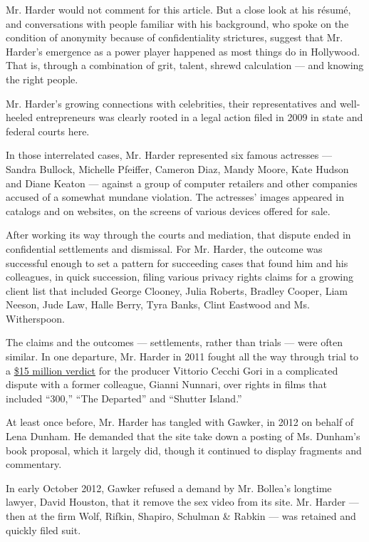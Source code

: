 Mr. Harder would not comment for this article. But a close look at his
résumé, and conversations with people familiar with his background, who
spoke on the condition of anonymity because of confidentiality
strictures, suggest that Mr. Harder's emergence as a power player
happened as most things do in Hollywood. That is, through a combination
of grit, talent, shrewd calculation --- and knowing the right people.

Mr. Harder's growing connections with celebrities, their representatives
and well-heeled entrepreneurs was clearly rooted in a legal action filed
in 2009 in state and federal courts here.

In those interrelated cases, Mr. Harder represented six famous actresses
--- Sandra Bullock, Michelle Pfeiffer, Cameron Diaz, Mandy Moore, Kate
Hudson and Diane Keaton --- against a group of computer retailers and
other companies accused of a somewhat mundane violation. The actresses'
images appeared in catalogs and on websites, on the screens of various
devices offered for sale.

After working its way through the courts and mediation, that dispute
ended in confidential settlements and dismissal. For Mr. Harder, the
outcome was successful enough to set a pattern for succeeding cases that
found him and his colleagues, in quick succession, filing various
privacy rights claims for a growing client list that included George
Clooney, Julia Roberts, Bradley Cooper, Liam Neeson, Jude Law, Halle
Berry, Tyra Banks, Clint Eastwood and Ms. Witherspoon.

The claims and the outcomes --- settlements, rather than trials --- were
often similar. In one departure, Mr. Harder in 2011 fought all the way
through trial to a
\href{http://variety.com/2011/biz/news/cecchi-gori-awarded-15-mil-in-suit-1118034590/}{\$15
million verdict} for the producer Vittorio Cecchi Gori in a complicated
dispute with a former colleague, Gianni Nunnari, over rights in films
that included ``300,'' ``The Departed'' and ``Shutter Island.''

At least once before, Mr. Harder has tangled with Gawker, in 2012 on
behalf of Lena Dunham. He demanded that the site take down a posting of
Ms. Dunham's book proposal, which it largely did, though it continued to
display fragments and commentary.

In early October 2012, Gawker refused a demand by Mr. Bollea's longtime
lawyer, David Houston, that it remove the sex video from its site. Mr.
Harder --- then at the firm Wolf, Rifkin, Shapiro, Schulman \& Rabkin
--- was retained and quickly filed suit.

